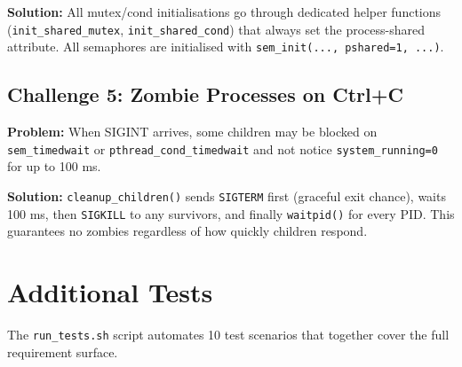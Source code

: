 \documentclass[12pt,a4paper]{article}
\newcommand{\code}[1]{\texttt{\small #1}}
\begin{document}
\textbf{Solution:} All mutex/cond initialisations go through dedicated helper
functions (\code{init\_shared\_mutex}, \code{init\_shared\_cond}) that always
set the process-shared attribute. All semaphores are initialised with
\code{sem\_init(..., pshared=1, ...)}.

\subsection{Challenge 5: Zombie Processes on Ctrl+C}

\textbf{Problem:} When SIGINT arrives, some children may be blocked on
\code{sem\_timedwait} or \code{pthread\_cond\_timedwait} and not notice
\code{system\_running=0} for up to 100 ms.

\textbf{Solution:} \code{cleanup\_children()} sends \code{SIGTERM} first (graceful
exit chance), waits 100 ms, then \code{SIGKILL} to any survivors, and finally
\code{waitpid()} for every PID. This guarantees no zombies regardless of how
quickly children respond.

\section{Additional Tests}

The \code{run\_tests.sh} script automates 10 test scenarios that together cover
the full requirement surface.
\end{document}
